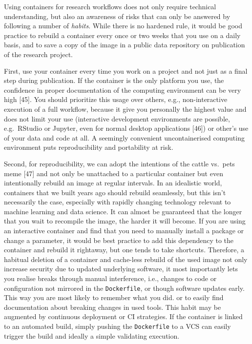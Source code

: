 \documentclass[10pt,letterpaper]{article}
\begin{document}
Using containers for research workflows does not only require technical
understanding, but also an awareness of risks that can only be answered
by following a number of \emph{habits}. While there is no hardened rule,
it would be good practice to rebuild a container every once or two weeks
that you use on a daily basis, and to save a copy of the image in a
public data repository on publication of the research project.

First, use your container every time you work on a project and not just
as a final step during publication. If the container is the only
platform you use, the confidence in proper documentation of the
computing environment can be very high {[}45{]}. You should prioritize
this usage over others, e.g., non-interactive execution of a full
workflow, because it give you personally the highest value and does not
limit your use (interactive development environments are possible,
e.g.~RStudio or Jupyter, even for normal desktop applications {[}46{]})
or other's use of your data and code at all. A seemingly convenient
uncontainerised computing environment puts reproducibility and
portability at risk.

Second, for reproducibility, we can adopt the intentions of the cattle
vs.~pets meme {[}47{]} and not only be unattached to a particular
container but even intentionally rebuild an image at regular intervals.
In an idealistic world, containers that we built years ago should
rebuild seamlessly, but this isn't necessarily the case, especially with
rapidly changing technology relevant to machine learning and data
science. It can almost be guaranteed that the longer that you wait to
recompile the image, the harder it will become. If you are using an
interactive container and find that you need to manually install a
package or change a parameter, it would be best practice to add this
dependency to the container and rebuild it rightaway, but one tends to
take shortcuts. Therefore, a habitual deletion of a container and
cache-less rebuild of the used image not only increase security due to
updated underlying software, it most importantly lets you realise breaks
through manual interference, i.e., changes to code or configuration not
mirrored in the \texttt{Dockerfile}, or though software updates early.
This way you are most likely to remember what you did. or to easily find
documentation about breaking changes in used tools. This habit may be
augmented by continuous deployment or CI strategies. If the container is
linked to an automated build, simply pushing the \texttt{Dockerfile} to
a VCS can easily trigger the build and ideally a simple validating
execution.
\end{document}

